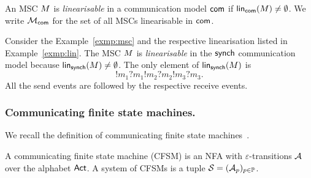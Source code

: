 \bigskip

\begin{definition}
	\label{def:linearisable-msc}
	An MSC $M$ is \textit{linearisable} in a communication 
	model $\mathsf{com}$
	if $\mathsf{lin}_{\mathsf{com}}(M)\neq\emptyset$.
	We write $\mathcal{M}_{\mathsf{com}}$ for the set of all MSCs 
	linearisable in $\mathsf{com}$.
\end{definition}

\bigskip

\begin{example}
Consider the Example~\ref{exmp:msc} and the respective linearisation
listed in Example~\ref{exmp:lin}. 
The MSC $M$ is \textit{linearisable} in the $\mathsf{synch}$ communication 
model because
$\mathsf{lin}_{\mathsf{synch}}(M)\neq\emptyset$.
The only element of $\mathsf{lin}_{\mathsf{synch}}(M)$ is
$$!m_1?m_1!m_2?m_2!m_3?m_3.$$
All the send events are followed by the respective
receive events.
\end{example}



  


\subsubsection*{Communicating finite state machines.}
We recall the definition of communicating finite state machines~\cite{BrandZafiropulo}.

\bigskip

\begin{definition}[CFSM]\label{def:cfsm}
    A communicating finite state machine (CFSM) is an NFA 
	with $\varepsilon$-transitions $\mathcal{A}$ over the alphabet $\mathsf{Act}$.
    A system of CFSMs is a tuple $\mathcal{S} = (\mathcal{A}_p)_{p\in\mathbb{P}}$.
\end{definition}

